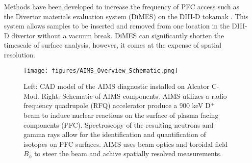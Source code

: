 \documentclass[11pt,a4paper,twocolumn]{article}
\begin{document}

Methods have been developed to increase the frequency of PFC access such as the Divertor materials evaluation system (DiMES) on the DIII-D tokamak \cite{wong1998divertor}.  This system allows samples to be inserted and removed from one location in the DIII-D divertor without a vacuum break.  DiMES can significantly shorten the timescale of surface analysis, however, it comes at the expense of spatial resolution.

\begin{figure*}[h]
 \centering
  \texttt{[image: figures/AIMS\_Overview\_Schematic.png]}
 \caption{Left: CAD model of the AIMS diagnostic installed on Alcator C-Mod.  Right: Schematic of AIMS components.  AIMS utilizes a radio frequency quadrupole (RFQ) accelerator produce a 900 keV D$^+$ beam to induce nuclear reactions on the surface of plasma facing components (PFC). Spectroscopy of the resulting neutrons and gamma rays allow for the identification and quantification of isotopes on PFC surfaces.  AIMS uses beam optics and toroidal field $B_\phi$ to steer the beam and achive spatially resolved measurements.}
 \label{fig:AIMSOverviewSchematic0}
\end{figure*}

\end{document}
